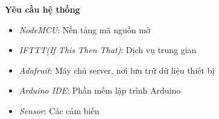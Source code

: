 \documentclass[11pt]{beamer}
\begin{document}
\begin{frame}[c]{}
	\textbf{Yêu cầu hệ thống}

	\vspace{1em}
	
	\begin{itemize}
		
		\setlength\itemsep{1.5em}

		\item{\textit{NodeMCU}: Nền tảng mã nguồn mở}
		
		\item{\textit{IFTTT(If This Then That)}: Dịch vụ trung gian}
		
		\item{\textit{Adafruit}: Máy chủ server, nơi lưu trữ dữ liệu thiết bị }
		
		\item{\textit{Arduino IDE}: Phần mềm lập trình Arduino}

		\item{\textit{Sensor}: Các cảm biến}

	\end{itemize}
\end{frame}

\end{document}
